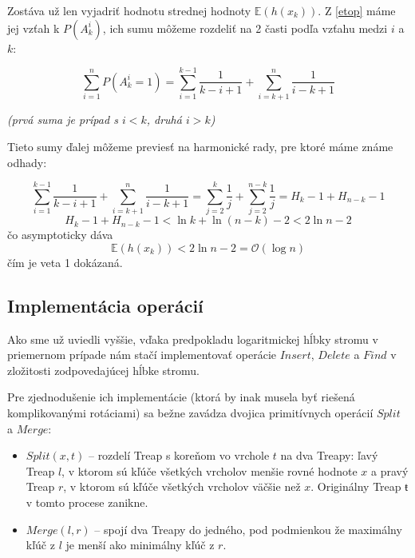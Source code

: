 \documentclass[a4paper, 12pt]{article}
\theoremstyle{definition}
\begin{document}
Zostáva už len vyjadriť hodnotu strednej hodnoty $\mathbb{E}(h(x_k))$. Z
\ref{etop} máme jej vzťah k $P(A^i_k)$, ich sumu môžeme rozdeliť na 2 časti
podľa vzťahu medzi $i$ a $k$:

\begin{equation}
    \sum_{i=1}^n P(A^i_k = 1) = \sum_{i=1}^{k-1} \frac{1}{k-i+1} +
    \sum_{i=k+1}^{n} \frac{1}{i-k+1}
\end{equation}

\begin{center}
\emph{(prvá suma je prípad s $i < k$, druhá $i > k$)}
\end{center}

Tieto sumy ďalej môžeme previesť na harmonické rady, pre ktoré máme známe
odhady:

\begin{equation}
    \sum_{i=1}^{k-1} \frac{1}{k-i+1} + \sum_{i=k+1}^{n} \frac{1}{i-k+1}
    = \sum_{j=2}^{k} \frac{1}{j} + \sum_{j=2}^{n-k} \frac{1}{j}
    = H_k - 1 + H_{n-k} - 1
\end{equation}
\begin{equation}
    H_k - 1 + H_{n-k} - 1 < \ln k + \ln(n-k) - 2 < 2 \ln n - 2
\end{equation}
čo asymptoticky dáva
\begin{equation}
    \mathbb{E}(h(x_k)) < 2 \ln n - 2 = \mathcal{O}(\log n)
\end{equation}
čím je veta 1 dokázaná.

\subsection{Implementácia operácií}

Ako sme už uviedli vyššie, vďaka predpokladu logaritmickej hĺbky stromu v
priemernom prípade nám stačí implementovať operácie $Insert$, $Delete$ a $Find$
v zložitosti zodpovedajúcej hĺbke stromu. 

Pre zjednodušenie ich implementácie (ktorá by inak musela byť riešená
komplikovanými rotáciami) sa bežne zavádza dvojica primitívnych operácií
$Split$ a $Merge$:

\begin{itemize}
    \item $Split(x, t)$ -- rozdelí Treap s koreňom vo vrchole $t$ na dva
        Treapy: ľavý Treap $l$, v ktorom sú kľúče všetkých vrcholov menšie
        rovné hodnote $x$ a pravý Treap $r$, v ktorom sú kľúče všetkých
        vrcholov väčšie než $x$.  Originálny Treap $ŧ$ v tomto procese zanikne.
    \item $Merge(l, r)$ -- spojí dva Treapy do jedného, pod podmienkou že
        maximálny kľúč z $l$ je menší ako minimálny kľúč z $r$.
\end{itemize}
\end{document}
